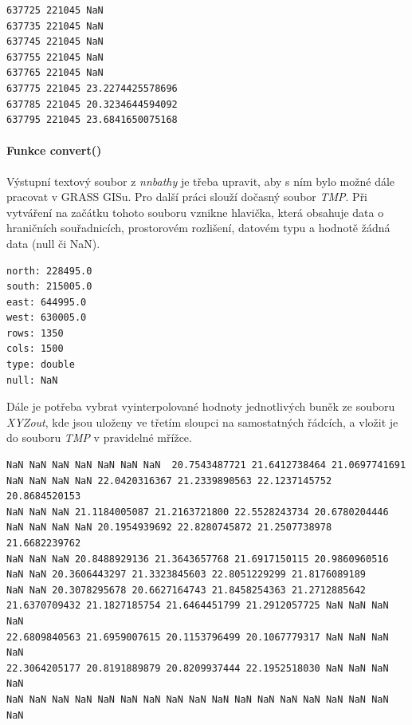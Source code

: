 \documentclass[12pt,a4paper]{article}
\begin{document}
\newpage
\lstset{basicstyle=\footnotesize}
\begin{lstlisting}[caption={XYZout}]
637725 221045 NaN
637735 221045 NaN
637745 221045 NaN
637755 221045 NaN
637765 221045 NaN
637775 221045 23.2274425578696
637785 221045 20.3234644594092
637795 221045 23.6841650075168
\end{lstlisting}

\bigskip
\paragraph{Funkce convert()}

Výstupní textový soubor z \emph{nnbathy} je třeba upravit, aby s ním
bylo možné dále pracovat v GRASS GISu. Pro další práci slouží dočasný
soubor \emph{TMP}. Při vytváření na začátku tohoto souboru vznikne
hlavička, která obsahuje data o hraničních souřadnicích, prostorovém
rozlišení, datovém typu a hodnotě žádná data (null či NaN).

\lstset{basicstyle=\ttfamily}
\begin{lstlisting}[caption={Hlavička souboru TMP}]
north: 228495.0
south: 215005.0
east: 644995.0
west: 630005.0
rows: 1350
cols: 1500
type: double
null: NaN
\end{lstlisting}

Dále je potřeba vybrat vyinterpolované hodnoty jednotlivých buněk ze
souboru \emph{XYZout}, kde jsou uloženy ve třetím sloupci na
samostatných řádcích, a vložit je do souboru \emph{TMP} v pravidelné
mřížce.

\lstset{basicstyle=\footnotesize}
\begin{lstlisting}
NaN NaN NaN NaN NaN NaN NaN  20.7543487721 21.6412738464 21.0697741691 
NaN NaN NaN NaN 22.0420316367 21.2339890563 22.1237145752 20.8684520153 
NaN NaN NaN 21.1184005087 21.2163721800 22.5528243734 20.6780204446 
NaN NaN NaN NaN 20.1954939692 22.8280745872 21.2507738978 21.6682239762 
NaN NaN NaN 20.8488929136 21.3643657768 21.6917150115 20.9860960516 
NaN NaN 20.3606443297 21.3323845603 22.8051229299 21.8176089189 
NaN NaN 20.3078295678 20.6627164743 21.8458254363 21.2712885642 
21.6370709432 21.1827185754 21.6464451799 21.2912057725 NaN NaN NaN NaN 
22.6809840563 21.6959007615 20.1153796499 20.1067779317 NaN NaN NaN NaN 
22.3064205177 20.8191889879 20.8209937444 22.1952518030 NaN NaN NaN NaN 
NaN NaN NaN NaN NaN NaN NaN NaN NaN NaN NaN NaN NaN NaN NaN NaN NaN NaN 

\end{lstlisting}
\end{document}

